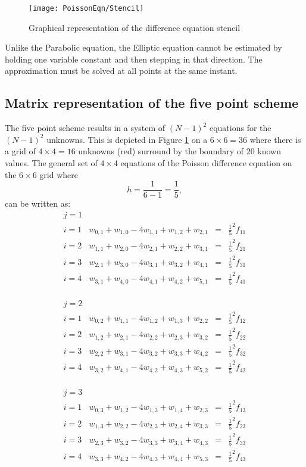\begin{figure}[H]
  \caption{Graphical representation of the difference equation stencil}\label{FivePoint}
  \centering
    \texttt{[image: PoissonEqn/Stencil]}
\end{figure}
Unlike the Parabolic equation, the Elliptic equation cannot be estimated by holding one
variable constant and then stepping in that direction. The approximation must be solved at all points at the same instant.\\
\subsection{Matrix representation of the five point scheme}
The five point scheme results in a system of $(N-1)^2$ equations for the $(N-1)^2$ unknowns. This is depicted in Figure \ref{FivePoint} on a $6 \times 6=36$ where there is a grid of $4\times4=16$ unknowns (red) surround by the boundary of $20$ known values.
The general set of $4\times4$ equations of the Poisson difference equation on the $6\times 6$ grid where 
\[h=\frac{1}{6-1}=\frac{1}{5},\]
 can be written as:
\[\begin{array}{l|rcl}
j=1\\
i=1&w_{0,1}+w_{1,0}-4w_{1,1}+w_{1,2}+w_{2,1}&=&\frac{1}{5}^2f_{11}\\
i=2&w_{1,1}+w_{2,0}-4w_{2,1}+w_{2,2}+w_{3,1}&=&\frac{1}{5}^2f_{21}\\
i=3&w_{2,1}+w_{3,0}-4w_{3,1}+w_{3,2}+w_{4,1}&=&\frac{1}{5}^2f_{31}\\
i=4&w_{3,1}+w_{4,0}-4w_{4,1}+w_{4,2}+w_{5,1}&=&\frac{1}{5}^2f_{41}\\
\end{array}
\]	

\[\begin{array}{l|rcl}
j=2\\
i=1&w_{0,2}+w_{1,1}-4w_{1,2}+w_{1,3}+w_{2,2}&=&\frac{1}{5}^2f_{12}\\
i=2&w_{1,2}+w_{2,1}-4w_{2,2}+w_{2,3}+w_{3,2}&=&\frac{1}{5}^2f_{22}\\
i=3&w_{2,2}+w_{3,1}-4w_{3,2}+w_{3,3}+w_{4,2}&=&\frac{1}{5}^2f_{32}\\
i=4&w_{3,2}+w_{4,1}-4w_{4,2}+w_{4,3}+w_{5,2}&=&\frac{1}{5}^2f_{42}\\
\end{array}
\]	

\[\begin{array}{l|rcl}
j=3\\
i=1&w_{0,3}+w_{1,2}-4w_{1,3}+w_{1,4}+w_{2,3}&=&\frac{1}{5}^2f_{13}\\
i=2&w_{1,3}+w_{2,2}-4w_{2,3}+w_{2,4}+w_{3,3}&=&\frac{1}{5}^2f_{23}\\
i=3&w_{2,3}+w_{3,2}-4w_{3,3}+w_{3,4}+w_{4,3}&=&\frac{1}{5}^2f_{33}\\
i=4&w_{3,3}+w_{4,2}-4w_{4,3}+w_{4,4}+w_{5,3}&=&\frac{1}{5}^2f_{43}\\
\end{array}
\]	

